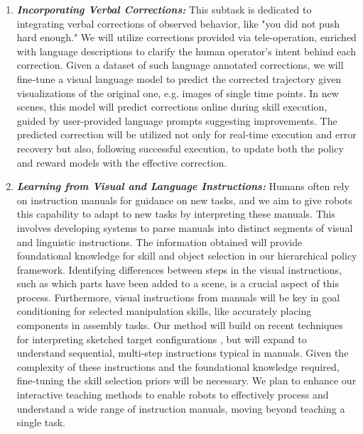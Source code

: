\documentclass{erc-B2}
\begin{document}
\begin{enumerate}
\item \textit{\textbf{Incorporating Verbal Corrections:}}
This subtask is dedicated to integrating verbal corrections of observed behavior, like "you did not push hard enough." We will utilize corrections provided via tele-operation, enriched with language descriptions to clarify the human operator's intent behind each correction. Given a dataset of such language annotated corrections, we will fine-tune a visual language model to predict the corrected trajectory given visualizations of the original one, e.g. images of single time points. In new scenes, this model will predict corrections online during skill execution, guided by user-provided language prompts suggesting improvements. The predicted correction will be utilized not only for real-time execution and error recovery but also, following successful execution, to update both the policy and reward models with the effective correction. 



\item \textit{\textbf{Learning from Visual and Language Instructions:}} Humans often rely on instruction manuals for guidance on new tasks, and we aim to give robots this capability to adapt to new tasks by interpreting these manuals. This involves developing systems to parse manuals into distinct segments of visual and linguistic instructions. The information obtained will provide foundational knowledge for skill and object selection in our hierarchical policy framework. Identifying differences between steps in the visual instructions, such as which parts have been added to a scene, is a crucial aspect of this process.
Furthermore, visual instructions from manuals will be key in goal conditioning for selected manipulation skills, like accurately placing components in assembly tasks. Our method will build on recent techniques for interpreting sketched target configurations \cite{Sundaresan2023RTSketch}, but will expand to understand sequential, multi-step instructions typical in manuals.
Given the complexity of these instructions and the foundational knowledge required, fine-tuning the skill selection priors will be necessary. We plan to enhance our interactive teaching methods to enable robots to effectively process and understand a wide range of instruction manuals, moving beyond teaching a single task.


\end{enumerate}
\end{document}
